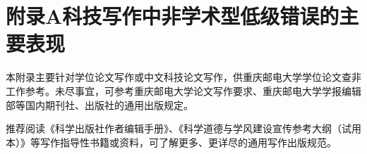 
\chapter{附录A\quad 科技写作中非学术型低级错误的主要表现}

%
%

本附录主要针对学位论文写作或中文科技论文写作，供重庆邮电大学学位论文查非工作参考。未尽事宜，可参考重庆邮电大学论文写作要求、重庆邮电大学学报编辑部等国内期刊社、出版社的通用出版规定。

推荐阅读《科学出版社作者编辑手册》、《科学道德与学风建设宣传参考大纲（试用本）》等写作指导性书籍或资料，可了解更多、更详尽的通用写作出版规范。